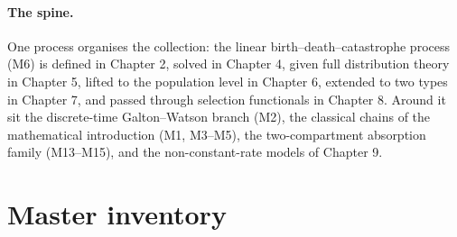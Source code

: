 \documentclass[11pt,a4paper]{article}
\begin{document}
\paragraph{The spine.} One process organises the collection: the linear
birth--death--catastrophe process (M6) is defined in Chapter 2, solved in
Chapter 4, given full distribution theory in Chapter 5, lifted to the
population level in Chapter 6, extended to two types in Chapter 7, and
passed through selection functionals in Chapter 8. Around it sit the
discrete-time Galton--Watson branch (M2), the classical chains of the
mathematical introduction (M1, M3--M5), the two-compartment absorption
family (M13--M15), and the non-constant-rate models of Chapter 9.

\section{Master inventory}
\end{document}
